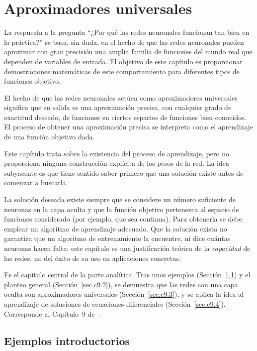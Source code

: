 \documentclass[12pt, a4paper]{amsbook}
\theoremstyle{remark}
\theoremstyle{definition}
\numberwithin{section}{chapter}
\numberwithin{subsection}{section}
\numberwithin{equation}{section}
\numberwithin{figure}{chapter}
\begin{document}
\chapter{Aproximadores universales}\label{cap9}

La respuesta a la pregunta “¿Por qué las redes neuronales funcionan tan bien en la práctica?” se basa, sin duda, en el hecho de que las redes neuronales pueden aproximar con gran precisión una amplia familia de funciones del mundo real que dependen de variables de entrada. El objetivo de este capítulo es proporcionar demostraciones matemáticas de este comportamiento para diferentes tipos de funciones objetivo.

El hecho de que las redes neuronales actúen como aproximadores universales significa que su salida es una aproximación precisa, con cualquier grado de exactitud deseado, de funciones en ciertos espacios de funciones bien conocidos. El proceso de obtener una aproximación precisa se interpreta como el aprendizaje de una función objetivo dada.

Este capítulo trata sobre la existencia del proceso de aprendizaje, pero no proporciona ninguna construcción explícita de los pesos de la red. La idea subyacente es que tiene sentido saber primero que una solución existe antes de comenzar a buscarla.

La solución deseada existe siempre que se considere un número suficiente de neuronas en la capa oculta y que la función objetivo pertenezca al espacio de funciones considerado (por ejemplo, que sea continua). Para obtenerla se debe emplear un algoritmo de aprendizaje adecuado. Que la solución exista no garantiza que un algoritmo de entrenamiento la encuentre, ni dice cuántas neuronas hacen falta: este capítulo es una justificación teórica de la {\em capacidad} de las redes, no del éxito de su uso en aplicaciones concretas.


Es el capítulo central de la parte analítica. Tras unos ejemplos (Sección~\ref{sec.c9.1}) y el planteo general (Sección~\ref{sec.c9.2}), se demuestra que las redes con una capa oculta son aproximadores universales (Sección~\ref{sec.c9.3}), y se aplica la idea al aprendizaje de soluciones de ecuaciones diferenciales (Sección~\ref{sec.c9.4}). Corresponde al Capítulo~9 de~\cite{Calin}.

\section{Ejemplos introductorios}\label{sec.c9.1}
\end{document}
